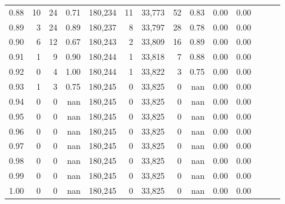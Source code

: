 \begin{tabular}{rrrrrrrrrrrrrr}
0.88 &      10 &     24 &  0.71 &  180,234 &       11 &  33,773 &      52 &  0.83 &  0.00 &      0.00 \\
0.89 &       3 &     24 &  0.89 &  180,237 &        8 &  33,797 &      28 &  0.78 &  0.00 &      0.00 \\
0.90 &       6 &     12 &  0.67 &  180,243 &        2 &  33,809 &      16 &  0.89 &  0.00 &      0.00 \\
0.91 &       1 &      9 &  0.90 &  180,244 &        1 &  33,818 &       7 &  0.88 &  0.00 &      0.00 \\
0.92 &       0 &      4 &  1.00 &  180,244 &        1 &  33,822 &       3 &  0.75 &  0.00 &      0.00 \\
0.93 &       1 &      3 &  0.75 &  180,245 &        0 &  33,825 &       0 &   nan &  0.00 &      0.00 \\
0.94 &       0 &      0 &   nan &  180,245 &        0 &  33,825 &       0 &   nan &  0.00 &      0.00 \\
0.95 &       0 &      0 &   nan &  180,245 &        0 &  33,825 &       0 &   nan &  0.00 &      0.00 \\
0.96 &       0 &      0 &   nan &  180,245 &        0 &  33,825 &       0 &   nan &  0.00 &      0.00 \\
0.97 &       0 &      0 &   nan &  180,245 &        0 &  33,825 &       0 &   nan &  0.00 &      0.00 \\
0.98 &       0 &      0 &   nan &  180,245 &        0 &  33,825 &       0 &   nan &  0.00 &      0.00 \\
0.99 &       0 &      0 &   nan &  180,245 &        0 &  33,825 &       0 &   nan &  0.00 &      0.00 \\
1.00 &       0 &      0 &   nan &  180,245 &        0 &  33,825 &       0 &   nan &  0.00 &      0.00 \\
\bottomrule
\end{tabular}
